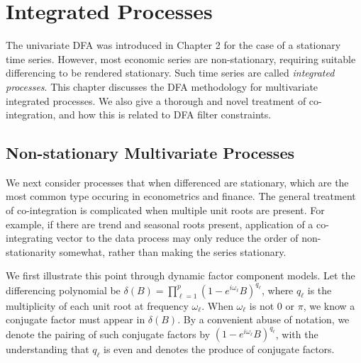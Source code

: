 \documentclass[a4paper]{book}
\def\eqinlaw{\stackrel{{\cal L}}{=}}
\def\tends{\rightarrow}
\def\tendsinf{\rightarrow\infty}
\def\isodynamo{\Leftrightarrow}
\begin{document}
\def\eqinlaw{\stackrel{{\cal L}}{=}}
\def\tends{\rightarrow}
\def\tendsinf{\rightarrow\infty}
\def\isodynamo{\Leftrightarrow}





\chapter{Integrated Processes}
\label{chap:coint}


The univariate DFA was introduced in Chapter 2 for the case of a stationary time series.  
However, most economic series are non-stationary, requiring suitable differencing to be
rendered stationary.  Such time series are called {\it integrated processes}.  This chapter discusses the
DFA methodology for multivariate integrated processes.  We also give a thorough and novel treatment
of co-integration, and how this is related to DFA filter constraints.
 

\section{Non-stationary Multivariate Processes}


We next consider processes that when differenced are 
stationary, which are the most common type occuring in econometrics and finance.   The general treatment of co-integration is complicated when
 multiple unit roots are present.  For example, if there are trend
 and seasonal roots present, application of a co-integrating vector
 to the data process may only reduce the order of non-stationarity
 somewhat, rather than making the series stationary. 

 We first illustrate this point through dynamic factor component models.  Let
 the differencing polynomial be $\delta (B) = \prod_{\ell=1}^p {(1 -
 e^{i \omega_{\ell}} B )}^{q_{\ell}}$, where $q_{\ell}$ is the
 multiplicity of each unit root at frequency $\omega_{\ell}$.  When $\omega_{\ell}$ is not $0$ or $\pi$,
 we know a conjugate factor must appear in $\delta (B)$.  By a convenient abuse of notation, we denote
the pairing of such conjugate factors by ${(1 - e^{i \omega_{\ell} } B)}^{q_{\ell}}$, with the understanding that
 $q_{\ell} $ is even and denotes the produce of conjugate factors.
\end{document}
